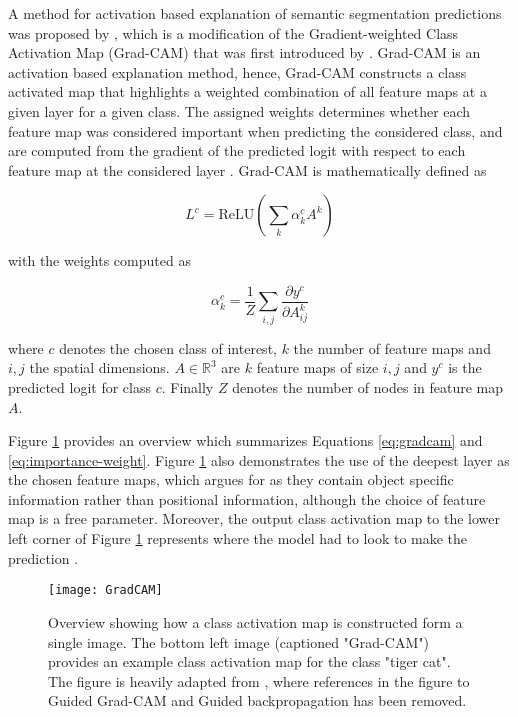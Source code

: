 \documentclass[../main/thesis.tex]{subfiles}
\begin{document}
A method for activation based explanation of semantic segmentation predictions was proposed by \citet{Vinogradova2020}, which is a modification of the Gradient-weighted Class Activation Map (Grad-CAM) that was first introduced by \citet{Selvaraju2016}. Grad-CAM is an activation based explanation method, hence, Grad-CAM constructs a class activated map that highlights a weighted combination of all feature maps at a given layer for a given class. The assigned weights determines whether each feature map was considered important when predicting the considered class, and are computed from the gradient of the predicted logit with respect to each feature map at the considered layer \citep{Selvaraju2016}. Grad-CAM is mathematically defined as

\begin{equation}
    \label{eq:gradcam}
    L^c = \text{ReLU}\left(\sum_k \alpha_k^c A^k\right)    
\end{equation}

with the weights computed as

\begin{equation}
    \label{eq:importance-weight}
    \alpha_k^c = \frac{1}{Z} \sum_{i,j} \frac{\partial{y^c}}{\partial{A_{ij}^k}}
\end{equation}

where $c$ denotes the chosen class of interest, $k$ the number of feature maps and $i,j$ the spatial dimensions. $A \in \mathbb{R}^3$ are $k$ feature maps of size $i,j$ and $y^c$ is the predicted logit for class $c$. Finally $Z$ denotes the number of nodes in feature map $A$. 

Figure \ref{fig:gradcam} provides an overview which summarizes Equations \ref{eq:gradcam} and \ref{eq:importance-weight}. Figure \ref{fig:gradcam} also demonstrates the use of the deepest layer as the chosen feature maps, which \citet{Selvaraju2016} argues for as they contain object specific information rather than positional information, although the choice of feature map is a free parameter. Moreover, the output class activation map to the lower left corner of Figure \ref{fig:gradcam} represents where the model had to look to make the prediction \citep{Selvaraju2016}.

\begin{figure}
    \centering
    \texttt{[image: GradCAM]}
    \caption{\label{fig:gradcam}Overview showing how a class activation map is constructed form a single image. The bottom left image (captioned "Grad-CAM") provides an example class activation map for the class "tiger cat". The figure is heavily adapted from \protect\citet{Selvaraju2016}, where references in the figure to Guided Grad-CAM and Guided backpropagation has been removed.}
\end{figure}
\end{document}
